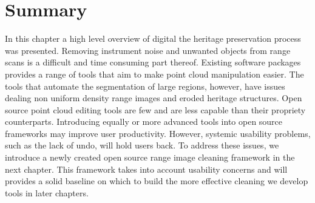 \section{Summary}
In this chapter a high level overview of digital the heritage preservation process was presented. Removing instrument noise and unwanted objects from range scans is a difficult and time consuming part thereof. Existing software packages provides a range of tools that aim to make point cloud manipulation easier. The tools that automate the segmentation of large regions, however, have issues dealing non uniform density range images and eroded heritage structures. Open source point cloud editing tools are few and are less capable than their propriety counterparts. Introducing equally or more advanced tools into open source frameworks may improve user productivity. However, systemic usability problems, such as the lack of undo, will hold users back. To address these issues, we introduce a newly created open source range image cleaning framework in the next chapter. This framework takes into account usability concerns and will provides a solid baseline on which to build the more effective cleaning we develop tools in later chapters.






